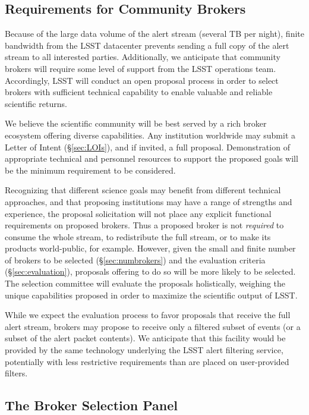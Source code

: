 \subsection{Requirements for Community Brokers}

Because of the large data volume of the alert stream (several TB per night), finite bandwidth from the LSST datacenter prevents sending a full copy of the alert stream to all interested parties.
Additionally, we anticipate that community brokers will require some level of support from the LSST operations team.
Accordingly, LSST will conduct an open proposal process in order to select brokers with sufficient technical capability to enable valuable and reliable scientific returns.

We believe the scientific community will be best served by a rich broker ecosystem offering diverse capabilities. 
Any institution worldwide may submit a Letter of Intent (\S \ref{sec:LOIs}), and if invited, a full proposal.
Demonstration of appropriate technical and personnel resources to support the proposed goals will be the minimum requirement to be considered.

Recognizing that different science goals may benefit from different technical approaches, and that proposing institutions may have a range of strengths and experience, the proposal solicitation will not place any explicit functional requirements on proposed brokers.  
Thus a proposed broker is not \textit{required} to consume the whole stream, to redistribute the full stream, or to make its products world-public, for example.
However, given the small and finite number of brokers to be selected (\S \ref{sec:numbrokers}) and the evaluation criteria (\S \ref{sec:evaluation}), proposals offering to do so will be more likely to be selected.
The selection committee will evaluate the proposals holistically, weighing the unique capabilities proposed in order to maximize the scientific output of LSST.

While we expect the evaluation process to favor proposals that receive the full alert stream, brokers may propose to receive only a filtered subset of events (or a subset of the alert packet contents).  
We anticipate that this facility would be provided by the same technology underlying the LSST alert filtering service, potentially with less restrictive requirements than are placed on user-provided filters. 

\subsection{The Broker Selection Panel}

